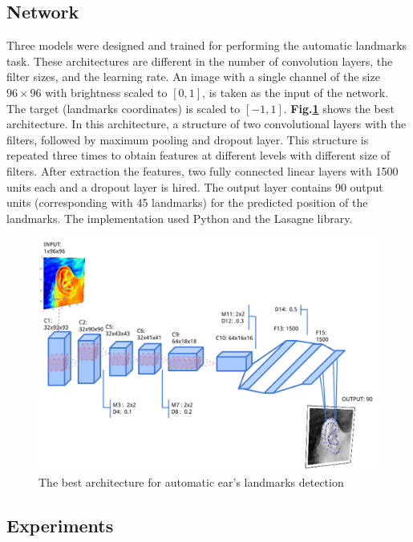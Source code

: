 \subsection{Network}
Three models were designed and trained for performing the automatic landmarks task. These architectures are different in the number of convolution layers, the filter sizes, and the learning rate. An image with a single channel of the size  $96 \times 96$ with brightness scaled to $[0,1]$, is taken as the input of the network. The target (landmarks coordinates) is scaled to $[-1,1]$. \textbf{Fig.\ref{1Econv}} shows the best architecture. In this architecture, a structure of two convolutional layers with the filters, followed by maximum pooling and dropout layer. This structure is repeated three times to obtain features at different levels with different size of filters. After extraction the features, two fully connected linear layers with 1500 units each and a dropout layer is hired. The output layer contains 90 output units (corresponding with 45 landmarks) for the predicted position of the landmarks. The implementation used Python and the Lasagne library\cite{lasagne}.
\begin{figure}[h!]
	\centering
	\includegraphics[scale=0.4]{images/ear_cnn}
	\caption{The best architecture for automatic ear's landmarks detection}
	\label{1Econv}
\end{figure}
\subsection{Experiments}

